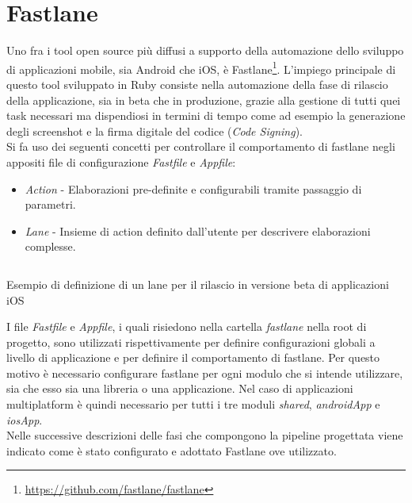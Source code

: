 \section{Fastlane}
Uno fra i tool open source più diffusi a supporto della automazione dello sviluppo di applicazioni mobile, sia Android che iOS, è Fastlane\footnote{\url{https://github.com/fastlane/fastlane}}. L'impiego principale di questo tool sviluppato in Ruby consiste nella automazione della fase di rilascio della applicazione, sia in beta che in produzione, grazie alla gestione di tutti quei task necessari ma dispendiosi in termini di tempo come ad esempio la generazione degli screenshot e la firma digitale del codice (\textit{Code Signing}).\\
Si fa uso dei seguenti concetti per controllare il comportamento di fastlane negli appositi file di configurazione \textit{Fastfile} e \textit{Appfile}:
\begin{itemize}
    \item \textit{Action} - Elaborazioni pre-definite e configurabili tramite passaggio di parametri.
    \item \textit{Lane} - Insieme di action definito dall'utente per descrivere elaborazioni complesse.
\end{itemize}

\begin{listing}[H]
\inputminted{ruby}{code/4-fastlane}
\caption{Esempio di definizione di un lane per il rilascio in versione beta di applicazioni iOS}
\end{listing}

I file \textit{Fastfile} e \textit{Appfile}, i quali risiedono nella cartella \textit{fastlane} nella root di progetto, sono utilizzati rispettivamente per definire configurazioni globali a livello di applicazione e per definire il comportamento di fastlane. Per questo motivo è necessario configurare fastlane per ogni modulo che si intende utilizzare, sia che esso sia una libreria o una applicazione. Nel caso di applicazioni multiplatform è quindi necessario per tutti i tre moduli \textit{shared}, \textit{androidApp} e \textit{iosApp}.\\
Nelle successive descrizioni delle fasi che compongono la pipeline progettata viene indicato come è stato configurato e adottato Fastlane ove utilizzato.
